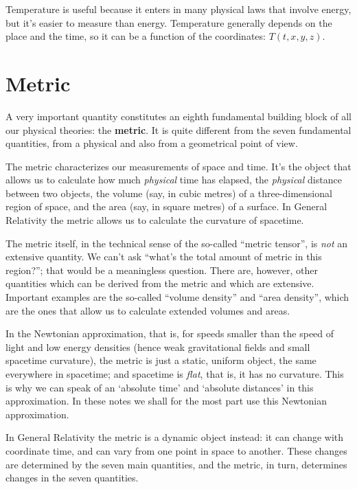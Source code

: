 \documentclass[a4paper,12pt,%
onecolumn,oneside,%
british%
]{memoir}
\renewcommand*{\|}[1][]{\nonscript\:#1\vert\nonscript\:\mathopen{}}
\newcommand*{\yT}{T}%
\begin{document}
\medskip

Temperature is useful because it enters in many physical laws that involve energy, but it's easier to measure than energy. Temperature generally depends on the place and the time, so it can be a function of the coordinates: $\yT(t, x,y,z)$.


\section{Metric}
\label{sec:metric}

A very important quantity constitutes an eighth fundamental building block of all our physical theories: the \textbf{metric}. It is quite different from the seven fundamental quantities, from a physical and also from a geometrical point of view.

The metric characterizes our measurements of space and time. It's the object that allows us to calculate how much \emph{physical} time has elapsed, the \emph{physical} distance between two objects, the volume (say, in cubic metres) of a three-dimensional region of space, and the area (say, in square metres) of a surface. In General Relativity the metric allows us to calculate the curvature of spacetime.

The metric itself, in the technical sense of the so-called \enquote{metric tensor}, is \emph{not} an extensive quantity. We can't ask \enquote{what's the total amount of metric in this region?}; that would be a meaningless question. There are, however, other quantities which can be derived from the metric and which are extensive. Important examples are the so-called \enquote{volume density} and \enquote{area density}, which are the ones that allow us to calculate extended volumes and areas.

In the Newtonian approximation, that is, for speeds smaller than the speed of light and low energy densities (hence weak gravitational fields and small spacetime curvature), the metric is just a static, uniform object, the same everywhere in spacetime; and spacetime is \emph{flat}, that is, it has no curvature. This is why we can speak of an \enquote*{absolute time} and \enquote*{absolute distances} in this approximation. In these notes we shall for the most part use this Newtonian approximation.

In General Relativity the metric is a dynamic object instead: it can change with coordinate time, and can vary from one point in space to another. These changes are determined by the seven main quantities, and the metric, in turn, determines changes in the seven quantities.
\end{document}

